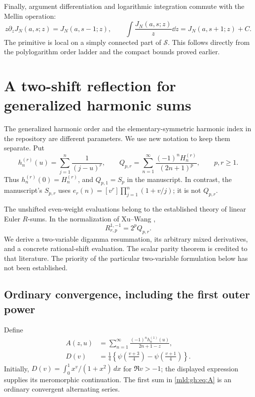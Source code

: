 Finally, argument differentiation and logarithmic integration commute with the Mellin operation:
\begin{equation}\label{mld:eq:argument-ladder}
 z\partial_z J_N(a,s;z)=J_N(a,s-1;z),\qquad
 \int \frac{J_N(a,s;z)}{z}\dd z=J_N(a,s+1;z)+C.
\end{equation}
The primitive is local on a simply connected part of $\mathcal S$. This follows directly from the polylogarithm order ladder and the compact bounds proved earlier.


\section{A two-shift reflection for generalized harmonic sums}
\label{mld:gh:sec:reflection}\label{mld:sec:harmonic}

The generalized harmonic order and the elementary-symmetric harmonic index
in the repository are different parameters. We use new notation to keep
them separate. Put
\[
 h_n^{(r)}(u)=\sum_{j=1}^n\frac1{(j-u)^r},\qquad
 Q_{p,r}=\sum_{n=1}^{\infty}\frac{(-1)^nH_n^{(r)}}{(2n+1)^p},
 \qquad p,r\geq1.
\]
Thus $h_n^{(r)}(0)=H_n^{(r)}$, and $Q_{p,1}=S_p$ in the manuscript.
In contrast, the manuscript's $S_{p,r}$ uses
$e_r(n)=[v^r]\prod_{j=1}^n(1+v/j)$; it is not $Q_{p,r}$.

The unshifted even-weight evaluations belong to the established theory
of linear Euler $R$-sums. In the normalization of Xu--Wang
\cite[Section~3.4, equation~(20)]{XuWang},
\begin{equation}\label{mld:gh:eq:normalization}
 R_{r,p}^{1,-1}=2^p Q_{p,r}.
\end{equation}
We derive a two-variable digamma resummation, its arbitrary mixed
derivatives, and a concrete rational-shift evaluation. The scalar parity
theorem is credited to that literature. The priority of the particular
two-variable formulation below has not been established.

\subsection{Ordinary convergence, including the first outer power}

Define
\begin{align}
 A(z,u)&=\sum_{n=1}^{\infty}
       \frac{(-1)^n h_n^{(1)}(u)}{2n+1-z},\label{mld:gh:eq:A}\\
 D(v)&=\frac14\left\{
       \psi\left(\frac{v+3}{4}\right)
       -\psi\left(\frac{v+1}{4}\right)\right\}.
       \label{mld:gh:eq:D}
\end{align}
Initially, $D(v)=\int_0^1x^v/(1+x^2)\,dx$ for $\Re v>-1$;
the displayed expression supplies its meromorphic continuation.
The first sum in \eqref{mld:gh:eq:A} is an ordinary convergent alternating
series.

